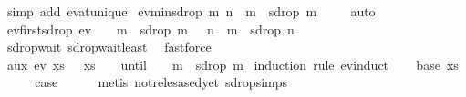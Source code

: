 \begin{isabellebody}
\ {\isacharparenleft}simp\ add{\isacharcolon}\ ev{\isacharunderscore}at{\isacharunderscore}unique{\isacharparenright}%
\endisatagproof
{\isafoldproof}%
%
\isadelimproof
\isanewline
%
\endisadelimproof
\isanewline
{}\isamarkupfalse%
\ ev{\isacharunderscore}min{\isacharunderscore}sdrop{\isacharcolon}\ {\isachardoublequoteopen}{\isasymexists}m{\isachardot}\ {\isacharparenleft}{\isasymforall}n\ {\isacharless}\ m{\isachardot}\ {\isasymnot}{\isasympsi}\ {\isacharparenleft}sdrop\ m\ {\isasymomega}{\isacharparenright}{\isacharparenright}{\isachardoublequoteclose}\isanewline
%
\isadelimproof
\ \ %
\endisadelimproof
%
\isatagproof
{}\isamarkupfalse%
\ auto%
\endisatagproof
{\isafoldproof}%
%
\isadelimproof
\isanewline
%
\endisadelimproof
\isanewline
{}\isamarkupfalse%
\ ev{\isacharunderscore}first{\isacharunderscore}sdrop{\isacharcolon}\ {\isachardoublequoteopen}ev\ {\isasympsi}\ {\isasymomega}\ {\isasymLongrightarrow}\ {\isasymexists}m{\isachardot}\ {\isasympsi}\ {\isacharparenleft}sdrop\ m\ {\isasymomega}{\isacharparenright}\ {\isasymand}\ {\isacharparenleft}{\isasymforall}n\ {\isacharless}\ m{\isachardot}\ {\isasymnot}{\isasympsi}\ {\isacharparenleft}sdrop\ n\ {\isasymomega}{\isacharparenright}{\isacharparenright}{\isachardoublequoteclose}\isanewline
%
\isadelimproof
\ \ %
\endisadelimproof
%
\isatagproof
{}\isamarkupfalse%
\ sdrop{\isacharunderscore}wait\ sdrop{\isacharunderscore}wait{\isacharunderscore}least\ \isamarkupfalse%
\ fastforce%
\endisatagproof
{\isafoldproof}%
%
\isadelimproof
\isanewline
%
\endisadelimproof
\isanewline
{}\isamarkupfalse%
\ aux{}{\isacharcolon}\ {\isachardoublequoteopen}ev\ {\isacharparenleft}{\isasymlambda}xs{\isachardot}\ {\isasymnot}\ {\isasymphi}\ xs{\isacharparenright}\ {\isasymomega}\ {\isasymLongrightarrow}\ {\isacharparenleft}{\isasymphi}\ until\ {\isasympsi}{\isacharparenright}\ {\isasymomega}\ {\isasymLongrightarrow}\ {\isasymexists}m{\isachardot}\ {\isasympsi}\ {\isacharparenleft}sdrop\ m\ {\isasymomega}{\isacharparenright}{\isachardoublequoteclose}\isanewline
%
\isadelimproof
%
\endisadelimproof
%
\isatagproof
{}\isamarkupfalse%
{\isacharparenleft}induction\ rule{\isacharcolon}\ ev{\isachardot}induct{\isacharparenright}\isanewline
\ \ \isamarkupfalse%
\ {\isacharparenleft}base\ xs{\isacharparenright}\isanewline
\ \ \isamarkupfalse%
\ \isamarkupfalse%
\ {\isacharquery}case\isanewline
\ \ \ \ \isamarkupfalse%
\ {\isacharparenleft}metis\ not{\isacharunderscore}relesased{\isacharunderscore}yet\ sdrop{\isachardot}simps{\isacharparenleft}{}{\isacharparenright}{\isacharparenright}\isanewline

\end{isabellebody}
